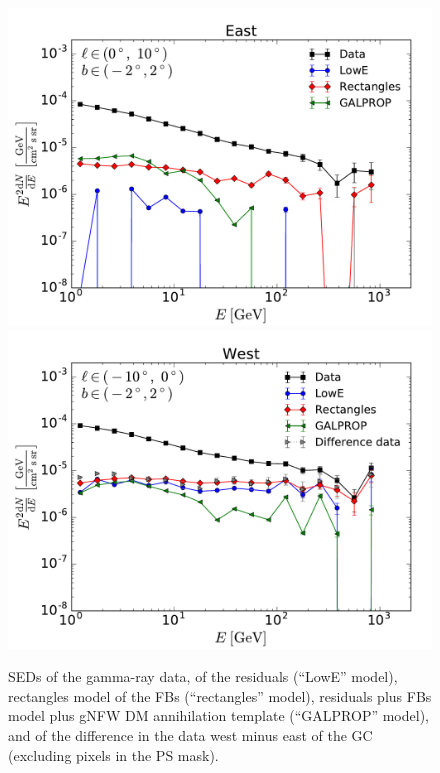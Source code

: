 \begin{figure}[h]
\centering
\includegraphics[width=\twopic\textwidth]{plots/SED_all_models_source_l=5_b=0.pdf}
\includegraphics[width=\twopic\textwidth]{plots/SED_all_models_source_l=-5_b=0.pdf}
  	\caption{SEDs of the gamma-ray data, of the residuals (``LowE'' model), 
	rectangles model of the FBs (``rectangles'' model),
	residuals plus FBs model plus gNFW DM annihilation template (``GALPROP'' model),
	and of the difference in the data west minus east of the GC (excluding pixels in the PS mask). 
	}
  	\label{fig:SED_all}
\end{figure}

